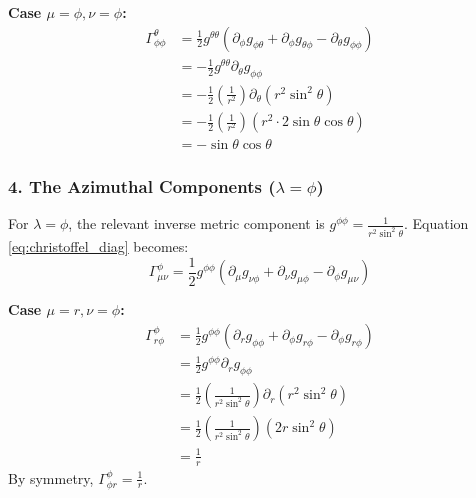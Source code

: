 \documentclass[11pt, a4paper]{report}
\begin{document}
\textbf{Case $\mu = \phi, \nu = \phi$:}
\begin{align}
    \Gamma^\theta_{\phi\phi} &= \frac{1}{2} g^{\theta\theta} (\partial_\phi g_{\phi\theta} + \partial_\phi g_{\theta\phi} - \partial_\theta g_{\phi\phi}) \nonumber \\
    &= -\frac{1}{2} g^{\theta\theta} \partial_\theta g_{\phi\phi} \nonumber \\
    &= -\frac{1}{2} \left( \frac{1}{r^2} \right) \partial_\theta \left( r^2 \sin^2\theta \right) \nonumber \\
    &= -\frac{1}{2} \left( \frac{1}{r^2} \right) \left( r^2 \cdot 2\sin\theta\cos\theta \right) \nonumber \\
    &= -\sin\theta\cos\theta
\end{align}

\subsubsection*{4. The Azimuthal Components ($\lambda = \phi$)}

For $\lambda = \phi$, the relevant inverse metric component is $g^{\phi\phi} = \frac{1}{r^2 \sin^2\theta}$.
Equation \eqref{eq:christoffel_diag} becomes:
\begin{equation}
    \Gamma^\phi_{\mu\nu} = \frac{1}{2} g^{\phi\phi} (\partial_\mu g_{\nu\phi} + \partial_\nu g_{\mu\phi} - \partial_\phi g_{\mu\nu})
\end{equation}

\textbf{Case $\mu = r, \nu = \phi$:}
\begin{align}
    \Gamma^\phi_{r\phi} &= \frac{1}{2} g^{\phi\phi} (\partial_r g_{\phi\phi} + \partial_\phi g_{r\phi} - \partial_\phi g_{r\phi}) \nonumber \\
    &= \frac{1}{2} g^{\phi\phi} \partial_r g_{\phi\phi} \nonumber \\
    &= \frac{1}{2} \left( \frac{1}{r^2 \sin^2\theta} \right) \partial_r \left( r^2 \sin^2\theta \right) \nonumber \\
    &= \frac{1}{2} \left( \frac{1}{r^2 \sin^2\theta} \right) \left( 2r \sin^2\theta \right) \nonumber \\
    &= \frac{1}{r}
\end{align}
By symmetry, $\Gamma^\phi_{\phi r} = \frac{1}{r}$.
\end{document}
